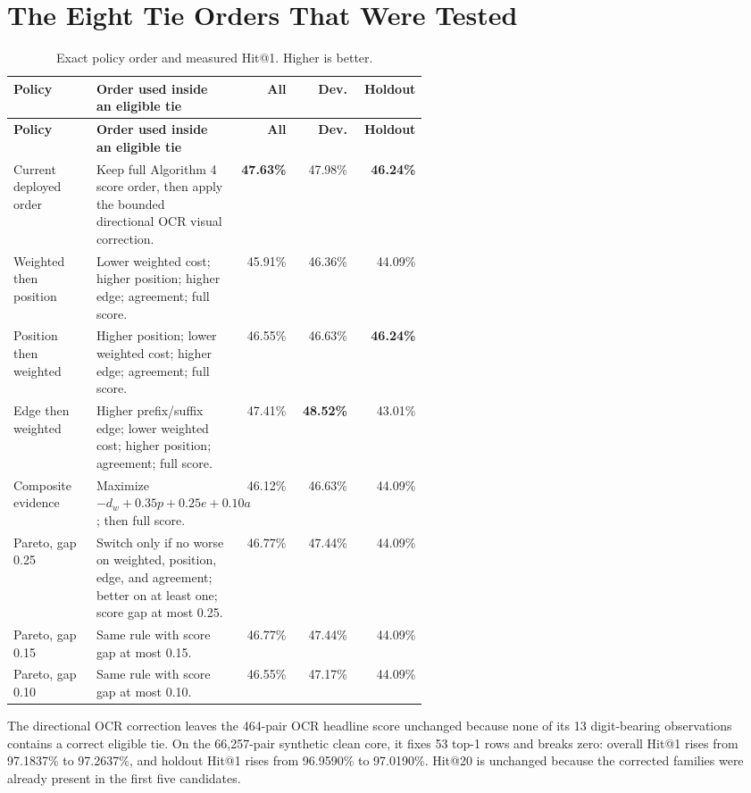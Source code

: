 \documentclass[11pt,a4paper]{article}
\begin{document}
\section{The Eight Tie Orders That Were Tested}

\begin{longtable}{@{}L{0.20\linewidth}L{0.34\linewidth}rrr@{}}
\caption{Exact policy order and measured Hit@1. Higher is better.}\label{tab:policies}\\
\toprule
\textbf{Policy} & \textbf{Order used inside an eligible tie} & \textbf{All} & \textbf{Dev.} & \textbf{Holdout} \\
\midrule
\endfirsthead
\toprule
\textbf{Policy} & \textbf{Order used inside an eligible tie} & \textbf{All} & \textbf{Dev.} & \textbf{Holdout} \\
\midrule
\endhead
Current deployed order & Keep full Algorithm 4 score order, then apply the bounded directional OCR visual correction. & \textbf{47.63\%} & 47.98\% & \textbf{46.24\%} \\
Weighted then position & Lower weighted cost; higher position; higher edge; agreement; full score. & 45.91\% & 46.36\% & 44.09\% \\
Position then weighted & Higher position; lower weighted cost; higher edge; agreement; full score. & 46.55\% & 46.63\% & \textbf{46.24\%} \\
Edge then weighted & Higher prefix/suffix edge; lower weighted cost; higher position; agreement; full score. & 47.41\% & \textbf{48.52\%} & 43.01\% \\
Composite evidence & Maximize $-d_w+0.35p+0.25e+0.10a$; then full score. & 46.12\% & 46.63\% & 44.09\% \\
Pareto, gap 0.25 & Switch only if no worse on weighted, position, edge, and agreement; better on at least one; score gap at most 0.25. & 46.77\% & 47.44\% & 44.09\% \\
Pareto, gap 0.15 & Same rule with score gap at most 0.15. & 46.77\% & 47.44\% & 44.09\% \\
Pareto, gap 0.10 & Same rule with score gap at most 0.10. & 46.55\% & 47.17\% & 44.09\% \\
\bottomrule
\end{longtable}

The directional OCR correction leaves the 464-pair OCR headline score unchanged
because none of its 13 digit-bearing observations contains a correct eligible
tie. On the 66,257-pair synthetic clean core, it fixes 53 top-1 rows and breaks
zero: overall Hit@1 rises from 97.1837\% to 97.2637\%, and holdout Hit@1 rises
from 96.9590\% to 97.0190\%. Hit@20 is unchanged because the corrected families
were already present in the first five candidates.
\end{document}
